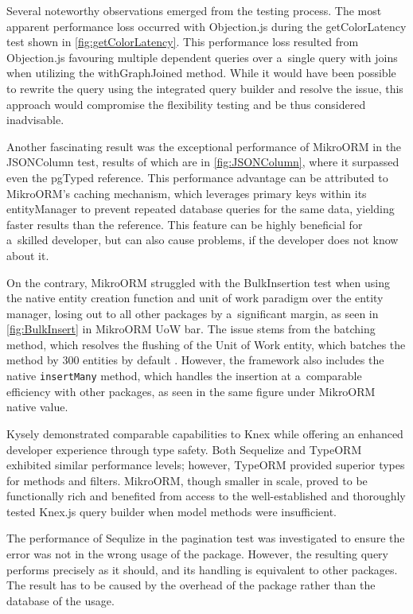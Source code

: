Several noteworthy observations emerged from the testing process. The most
apparent performance loss occurred with Objection.js during the getColorLatency
test shown in \autoref{fig:getColorLatency}. This performance loss resulted from
Objection.js favouring multiple dependent queries over a~single query with joins
when utilizing the withGraphJoined method. While it would have been possible to
rewrite the query using the integrated query builder and resolve the issue, this
approach would compromise the flexibility testing and be thus considered
inadvisable.



Another fascinating result was the exceptional performance of MikroORM in the
JSONColumn test, results of which are in \autoref{fig:JSONColumn}, where it
surpassed even the pgTyped reference. This performance advantage can be
attributed to MikroORM's caching mechanism, which leverages primary keys within
its entityManager to prevent repeated database queries for the same data,
yielding faster results than the reference. This feature can be highly
beneficial for a~skilled developer, but can also cause problems, if the
developer does not know about it.

On the contrary, MikroORM struggled with the BulkInsertion test when using the
native entity creation function and unit of work paradigm over the entity
manager, losing out to all other packages by a~significant margin, as seen in
\autoref{fig:BulkInsert} in MikroORM UoW bar. The issue stems from the batching
method, which resolves the flushing of the Unit of Work entity, which batches
the method by 300 entities by default \cite{MikroORMBatching}. However, the
framework also includes the native \texttt{insertMany} method, which handles the
insertion at a~comparable efficiency with other packages, as seen in the same
figure under MikroORM native value.

Kysely demonstrated comparable capabilities to Knex while offering an enhanced
developer experience through type safety. Both Sequelize and TypeORM exhibited
similar performance levels; however, TypeORM provided superior types for methods
and filters. MikroORM, though smaller in scale, proved to be functionally rich
and benefited from access to the well-established and thoroughly tested Knex.js
query builder when model methods were insufficient.

The performance of Sequlize in the pagination test was investigated to ensure
the error was not in the wrong usage of the package. However, the resulting
query performs precisely as it should, and its handling is equivalent to other
packages. The result has to be caused by the overhead of the package rather than
the database of the usage.

